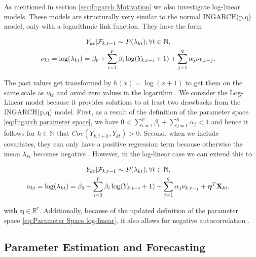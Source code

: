 As mentioned in section \ref{sec:Ingarch Motivation} we also investigate log-linear models. These models are structurally very similar to the normal INGARCH(p,q) model, only with a logarithmic link function. They have the form 

\begin{equation}
\begin{gathered}
Y_{kt} | \mathcal{F}_{k,t-1} \sim P(\lambda_{kt}); \forall t \in \mathbb{N}, \\
\nu_{kt}= \log(\lambda_{kt}) = \beta_0 + \sum_{i=1}^p\beta_i \log(Y_{k,t-i}+1) + \sum_{j=1}^q\alpha_j \nu_{k,t-j}.
\label{eq:Log-Linear model}
\end{gathered}
\end{equation}

The past values get transformed by $h(x)=\log(x+1)$ to get them on the same scale as $\nu_{kt}$ and avoid zero values in the logarithm \cite{Liboschik:2016,Fokianos:2011}. We consider the Log-Linear model because it provides solutions to at least two drawbacks from the INGARCH(p,q) model. First, as a result of the definition of the parameter space \ref{eq:Ingarch parameter space}, we have $0 < \sum_{i=1}^p\beta_i + \sum_{j=1}^q\alpha_j < 1$ and hence it follows for $h\in \mathbb{N}$ that $Cov(Y_{k,t+h},Y_{kt})>0$. Second, when we include covariates, they can only have a positive regression term because otherwise the mean $\lambda_{kt}$ becomes negative \cite{Fokianos:2011}. However, in the log-linear case we can extend this to

\begin{equation}
\begin{gathered}
Y_{kt} | \mathcal{F}_{k,t-1} \sim P(\lambda_{kt}); \forall t \in \mathbb{N}, \\
\nu_{kt}= \log(\lambda_{kt}) = \beta_0 + \sum_{i=1}^p\beta_i \log(Y_{k,t-i}+1) + \sum_{j=1}^q\alpha_j \nu_{k,t-j} + \bm{\eta}^T\textbf{X}_{kt}.
\label{eq:Log-Linear model external factors}
\end{gathered}
\end{equation}

with $\bm{\eta} \in \mathbb{R}^r$. Additionally, because of the updated definition of the parameter space \ref{eq:Parameter Space log-linear}, it also allows for negative autocorrelation \cite{Liboschik:2016}. 

\subsection{Parameter Estimation and Forecasting}
\label{sec: Log-Linear Parameter Estimation and Forecasting}


